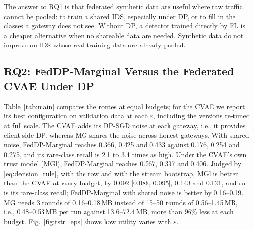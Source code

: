 The answer to RQ1 is that federated synthetic data are useful where raw traffic cannot be pooled: to train a shared IDS, especially under DP, or to fill in the classes a gateway does not see. Without DP, a detector trained directly by FL is a cheaper alternative when no shareable data are needed. Synthetic data do not improve an IDS whose real training data are already pooled.

\subsection{RQ2: FedDP-Marginal Versus the Federated CVAE Under DP}\label{subsec:rq2}
Table~\ref{tab:main} compares the routes at equal budgets; for the CVAE we report its best configuration on validation data at each $\varepsilon$, including the versions re-tuned at full scale. The CVAE adds its DP-SGD noise at each gateway, i.e., it provides client-side DP, whereas MG shares the noise across honest gateways. With shared noise, FedDP-Marginal reaches 0.366, 0.425 and 0.433 against 0.176, 0.254 and 0.275, and its rare-class recall is 2.1 to 3.4 times as high. Under the CVAE's own trust model (MGl), FedDP-Marginal reaches 0.267, 0.397 and 0.406. Judged by \eqref{eq:decision_rule}, with the row and with the stream bootstrap, MGl is better than the CVAE at every budget, by 0.092 [0.088, 0.095], 0.143 and 0.131, and so is its rare-class recall; FedDP-Marginal with shared noise is better by 0.16--0.19. MG needs 3 rounds of 0.16--0.18\,MB instead of 15--50 rounds of 0.56--1.45\,MB, i.e., 0.48--0.53\,MB per run against 13.6--72.4\,MB, more than 96\% less at each budget. Fig.~\ref{fig:tstr_eps} shows how utility varies with $\varepsilon$.


